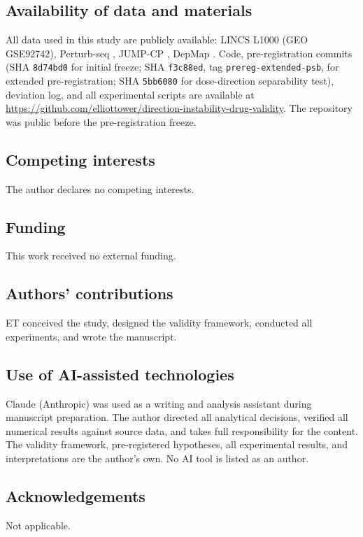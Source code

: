 \documentclass[11pt]{article}
\begin{document}
\subsection*{Availability of data and materials}
All data used in this study are publicly available: LINCS L1000
(GEO GSE92742), Perturb-seq \citep{replogle2022mapping}, JUMP-CP
\citep{chandrasekaran2023jump}, DepMap \citep{dempster2021chronos}.
Code, pre-registration commits (SHA \texttt{8d74bd0} for initial
freeze; SHA \texttt{f3c88ed}, tag \texttt{prereg-extended-psb}, for
extended pre-registration; SHA \texttt{5bb6080} for dose-direction
separability test), deviation log, and all experimental scripts are
available at
\url{https://github.com/elliottower/direction-instability-drug-validity}.
The repository was public before the pre-registration freeze.

\subsection*{Competing interests}
The author declares no competing interests.

\subsection*{Funding}
This work received no external funding.

\subsection*{Authors' contributions}
ET conceived the study, designed the validity framework, conducted
all experiments, and wrote the manuscript.

\subsection*{Use of AI-assisted technologies}
Claude (Anthropic) was used as a writing and analysis assistant during manuscript preparation. The author directed all analytical decisions, verified all numerical results against source data, and takes full responsibility for the content. The validity framework, pre-registered hypotheses, all experimental results, and interpretations are the author's own. No AI tool is listed as an author.

\subsection*{Acknowledgements}
Not applicable.
\end{document}
